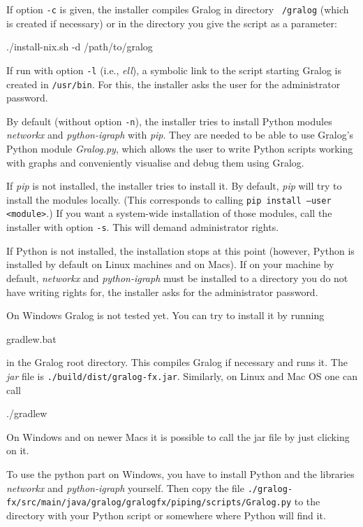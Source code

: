 \documentclass{article}
\begin{document}
If option \texttt{-c} is given, the installer compiles Gralog in
directory \texttt{~/gralog} (which is created if necessary) or in the directory you give the script as a parameter:
\\\begin{tcolorbox}
  ./install-nix.sh -d /path/to/gralog
\end{tcolorbox}

If run with option \texttt{-l} (i.e., \emph{ell}), a symbolic link to the script starting Gralog is created in
\texttt{/usr/bin}. For this, the installer asks the user for the administrator
password.

By default (without option \texttt{-n}), the installer tries to
install Python modules \emph{networkx} and \emph{python-igraph} with
\emph{pip}. They are needed to be able to use Gralog's Python module
\emph{Gralog.py}, which allows the user to write Python scripts
working with graphs and conveniently visualise and debug them using
Gralog.

If \emph{pip} is not installed, the installer tries to install it. By
default, \emph{pip} will try to install the modules locally. (This
corresponds to calling \texttt{pip install --user <module>}.) If you
want a system-wide installation of those modules, call the installer
with option \texttt{-s}. This will demand administrator rights.

If
Python is not installed, the installation stops at this point
(however, Python is installed by default on Linux machines and on
Macs). If on your machine by default, \emph{networkx} and
\emph{python-igraph} must be installed to a directory you do not have
writing rights for, the installer asks for the administrator password.


On Windows Gralog is not tested yet. You can try to install it by
running
\\\begin{tcolorbox}
  gradlew.bat
\end{tcolorbox}
in the Gralog root directory. This compiles Gralog if necessary and
runs it. The \emph{jar} file is
\texttt{./build/dist/gralog-fx.jar}. Similarly, on Linux and Mac OS
one can call
\\\begin{tcolorbox}
  ./gradlew
\end{tcolorbox}

On Windows and on newer Macs it is possible to call the jar file by
just clicking on it.

To use the python part on Windows, you have to install Python and the
libraries \emph{networkx} and \emph{python-igraph} yourself. Then copy
the file
\texttt{./gralog-fx/src/main/java/gralog/gralogfx/piping/scripts/Gralog.py}
to the directory with your Python script or somewhere where Python
will find it.
\end{document}
